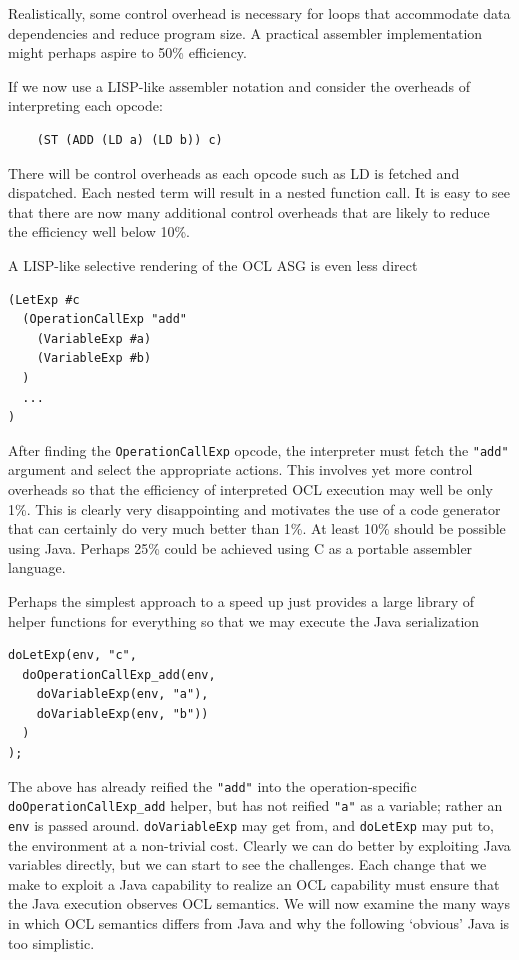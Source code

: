 \documentclass[sigconf]{acmart}
\begin{document}
Realistically, some control overhead is necessary for loops that accommodate data dependencies and reduce program size. A practical assembler implementation might perhaps aspire to 50\% efficiency.

If we now use a LISP-like assembler notation and consider the overheads of interpreting each opcode:
  
\begin{verbatim}
	(ST (ADD (LD a) (LD b)) c)
\end{verbatim}

There will be control overheads as each opcode such as LD is fetched and dispatched. Each nested term will result in a nested function call. It is easy to see that there are now many additional control overheads that are likely to reduce the efficiency well below 10\%.

A LISP-like selective rendering of the OCL ASG is even less direct

\begin{verbatim}
(LetExp #c
  (OperationCallExp "add"
    (VariableExp #a)
    (VariableExp #b)
  )
  ...
)
\end{verbatim}

After finding the \verb|OperationCallExp| opcode, the interpreter must fetch the \verb|"add"| argument and select the appropriate actions. This involves yet more control overheads so that the efficiency of interpreted OCL execution may well be only 1\%. This is clearly very disappointing and motivates the use of a code generator that can certainly do very much better than 1\%. At least 10\% should be possible using Java. Perhaps 25\% could be achieved using C as a portable assembler language. 

Perhaps the simplest approach to a speed up just provides a large library of helper functions for everything so that we may execute the Java serialization

\begin{verbatim}
doLetExp(env, "c", 
  doOperationCallExp_add(env, 
    doVariableExp(env, "a"),
    doVariableExp(env, "b"))
  )
);
\end{verbatim}

The above has already reified the \verb|"add"| into the operation-specific \verb|doOperationCallExp_add| helper, but has not reified \verb|"a"| as a variable; rather an \verb|env| is passed around. \verb|doVariableExp| may get from, and  \verb|doLetExp| may put to, the environment at a non-trivial cost. Clearly we can do better by exploiting Java variables directly, but we can start to see the challenges. Each change that we make to exploit a Java capability to realize an OCL capability must ensure that the Java execution observes OCL semantics. We will now examine the many ways in which OCL semantics differs from Java and why the following `obvious' Java is too simplistic.
\end{document}
